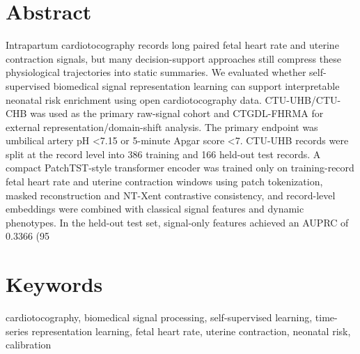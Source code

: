 \documentclass[11pt]{article}
\begin{document}
        \section*{Abstract}
        Intrapartum cardiotocography records long paired fetal heart rate and uterine contraction signals, but many decision-support approaches still compress these physiological trajectories into static summaries. We evaluated whether self-supervised biomedical signal representation learning can support interpretable neonatal risk enrichment using open cardiotocography data. CTU-UHB/CTU-CHB was used as the primary raw-signal cohort and CTGDL-FHRMA for external representation/domain-shift analysis. The primary endpoint was umbilical artery pH <7.15 or 5-minute Apgar score <7. CTU-UHB records were split at the record level into 386 training and 166 held-out test records. A compact PatchTST-style transformer encoder was trained only on training-record fetal heart rate and uterine contraction windows using patch tokenization, masked reconstruction and NT-Xent contrastive consistency, and record-level embeddings were combined with classical signal features and dynamic phenotypes. In the held-out test set, signal-only features achieved an AUPRC of 0.3366 (95%

        \section*{Keywords}
        cardiotocography, biomedical signal processing, self-supervised learning, time-series representation learning, fetal heart rate, uterine contraction, neonatal risk, calibration
\end{document}
